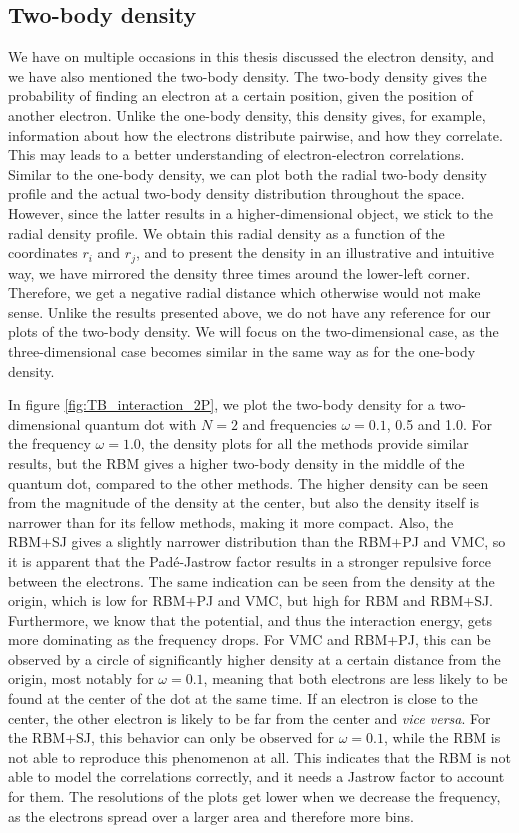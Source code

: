 \subsection{Two-body density}
We have on multiple occasions in this thesis discussed the electron density, and we have also mentioned the two-body density. The two-body density gives the probability of finding an electron at a certain position, given the position of another electron. Unlike the one-body density, this density gives, for example, information about how the electrons distribute pairwise, and how they correlate. This may leads to a better understanding of electron-electron correlations. Similar to the one-body density, we can plot both the radial two-body density profile and the actual two-body density distribution throughout the space. However, since the latter results in a higher-dimensional object, we stick to the radial density profile. We obtain this radial density as a function of the coordinates $r_i$ and $r_j$, and to present the density in an illustrative and intuitive way, we have mirrored the density three times around the lower-left corner. Therefore, we get a negative radial distance which otherwise would not make sense. Unlike the results presented above, we do not have any reference for our plots of the two-body density. We will focus on the two-dimensional case, as the three-dimensional case becomes similar in the same way as for the one-body density. 

In figure \eqref{fig:TB_interaction_2P}, we plot the two-body density for a two-dimensional quantum dot with $N=2$ and frequencies $\omega=0.1$, 0.5 and 1.0. For the frequency $\omega=1.0$, the density plots for all the methods provide similar results, but the RBM gives a higher two-body density in the middle of the quantum dot, compared to the other methods. The higher density can be seen from the magnitude of the density at the center, but also the density itself is narrower than for its fellow methods, making it more compact. Also, the RBM+SJ gives a slightly narrower distribution than the RBM+PJ and VMC, so it is apparent that the Padé-Jastrow factor results in a stronger repulsive force between the electrons. The same indication can be seen from the density at the origin, which is low for RBM+PJ and VMC, but high for RBM and RBM+SJ. Furthermore, we know that the potential, and thus the interaction energy, gets more dominating as the frequency drops. For VMC and RBM+PJ, this can be observed by a circle of significantly higher density at a certain distance from the origin, most notably for $\omega=0.1$, meaning that both electrons are less likely to be found at the center of the dot at the same time. If an electron is close to the center, the other electron is likely to be far from the center and \textit{vice versa}. For the RBM+SJ, this behavior can only be observed for $\omega=0.1$, while the RBM is not able to reproduce this phenomenon at all. This indicates that the RBM is not able to model the correlations correctly, and it needs a Jastrow factor to account for them. The resolutions of the plots get lower when we decrease the frequency, as the electrons spread over a larger area and therefore more bins.

